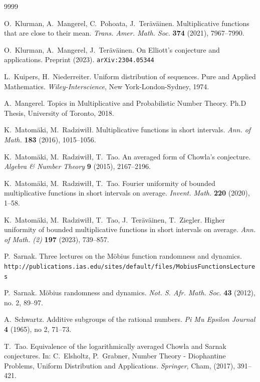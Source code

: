 \documentclass[11pt]{amsart}
\theoremstyle{definition}
\begin{document}
\begin{thebibliography}{9999}
	
	O.~Klurman, A.~Mangerel, C.~Pohoata,  J.~Ter\"av\"ainen. Multiplicative functions that are close to
	their mean. {\em Trans. Amer. Math. Soc.} {\bf 374} (2021), 7967--7990.

 O.~Klurman, A.~Mangerel, J.~Ter\"av\"ainen.	On Elliott's conjecture and applications. Preprint (2023). \texttt{arXiv:2304.05344}
	
	 L.~Kuipers, H.~Niederreiter.  Uniform distribution
	of sequences.  Pure and Applied Mathematics. {\em
		Wiley-Interscience}, New York-London-Sydney, 1974.
		
		A.~Mangerel. Topics in Multiplicative and Probabilistic Number Theory. Ph.D Thesis, University of Toronto, 2018.
	
	K.~Matom\"aki, M.~Radziwi{\l}{\l}.
	Multiplicative functions in short intervals.  {\em Ann. of Math.}   {\bf 183} (2016), 1015--1056.
	
	K.~Matom\"aki, M.~Radziwi{\l}{\l},  T.~Tao.
	An averaged form of Chowla's conjecture.  {\em Algebra \& Number Theory} \textbf{9} (2015), 2167--2196.
	
		K.~Matom\"aki, M.~Radziwi{\l}{\l},  T.~Tao.  Fourier uniformity of bounded multiplicative functions in short intervals on average. {\em  Invent. Math.}  \textbf{220} (2020), 1--58.
	
	K.~Matom\"aki, M.~Radziwi{\l}{\l},  T.~Tao, J.~Ter\"av\"ainen, T.~Ziegler.
Higher uniformity of bounded multiplicative functions in short intervals on average.
 {\em Ann. of Math. (2)}
	\textbf{197} (2023), 739--857.
	
	
	P.~Sarnak. Three lectures on the M\"obius function randomness and dynamics.\\  \texttt{http://publications.ias.edu/sites/default/files/MobiusFunctionsLectures}
	

	 P.~Sarnak.  M\"obius randomness and dynamics.
	{\em  Not. S. Afr. Math. Soc.} {\bf 43}
	(2012), no. 2, 89--97.
	
	A.~Schwartz. Additive subgroups of the rational numbers.
	{\em Pi Mu Epsilon Journal}
	{\bf 4}  (1965), no 2,  71--73.
	
T.~Tao.
Equivalence of the logarithmically averaged Chowla and Sarnak conjectures. In: C.~Elsholtz, P.~Grabner,  Number Theory -  Diophantine Problems, Uniform Distribution and Applications. {\em  Springer}, Cham, (2017), 391--421.
	

\end{thebibliography}
\end{document}
